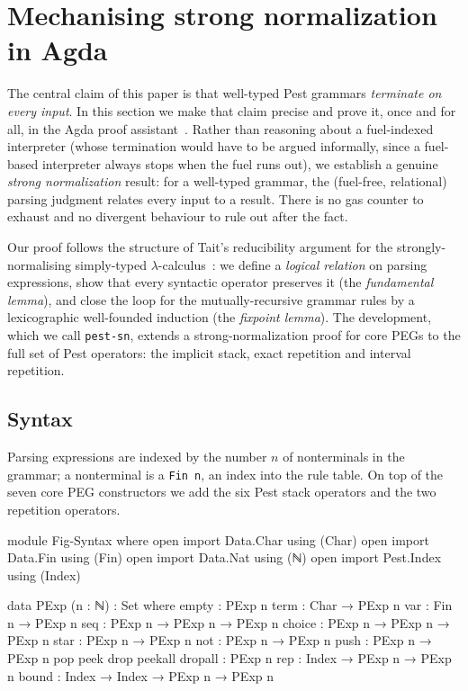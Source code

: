 \documentclass[preprint,12pt]{elsarticle}
\theoremstyle{definition}
\begin{document}
\section{Mechanising strong normalization in Agda}\label{sec:typesoundnesslean}

The central claim of this paper is that well-typed Pest grammars
\emph{terminate on every input}. In this section we make that claim precise and
prove it, once and for all, in the Agda proof
assistant~\cite{agda}. Rather than reasoning about a fuel-indexed interpreter (whose termination would have to be argued informally, since a fuel-based interpreter always stops when the fuel runs out), we establish a genuine
\emph{strong normalization} result: for a well-typed grammar, the (fuel-free,
relational) parsing judgment relates every input to a result. There is no
gas counter to exhaust and no divergent behaviour to rule out after the fact.

Our proof follows the structure of Tait's reducibility argument for the
strongly-normalising simply-typed $\lambda$-calculus~\cite{plfa22.08}: we define
a \emph{logical relation} on parsing expressions, show that every syntactic
operator preserves it (the \emph{fundamental lemma}), and close the loop for the
mutually-recursive grammar rules by a lexicographic well-founded induction (the
\emph{fixpoint lemma}). The development, which we call \texttt{pest-sn}, extends
a strong-normalization proof for core PEGs to the full set of Pest operators:
the implicit stack, exact repetition and interval repetition.

\subsection{Syntax}\label{sec:agda-syntax}

Parsing expressions are indexed by the number $n$ of nonterminals in the
grammar; a nonterminal is a \lstinline{Fin n}, an index into the rule table. On
top of the seven core PEG constructors we add the six Pest stack operators and
the two repetition operators.

\begin{code}[hide]
module Fig-Syntax where
  open import Data.Char using (Char)
  open import Data.Fin using (Fin)
  open import Data.Nat using (ℕ)
  open import Pest.Index using (Index)
\end{code}
\begin{code}
  data PExp (n : ℕ) : Set where
    empty   : PExp n
    term    : Char → PExp n
    var     : Fin n → PExp n
    seq     : PExp n → PExp n → PExp n
    choice  : PExp n → PExp n → PExp n
    star    : PExp n → PExp n
    not     : PExp n → PExp n
    push    : PExp n → PExp n
    pop peek drop peekall dropall : PExp n
    rep     : Index → PExp n → PExp n
    bound   : Index → Index → PExp n → PExp n
\end{code}
\end{document}
